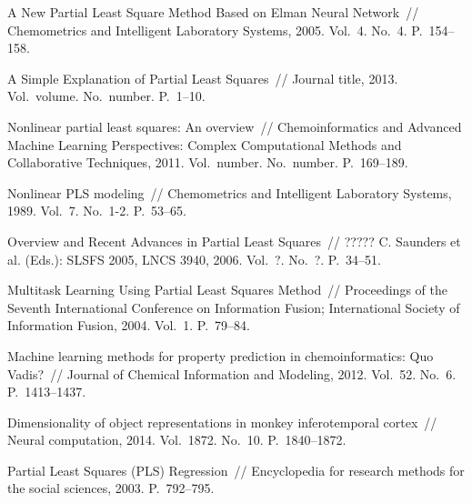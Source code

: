 \documentclass[12pt,twoside]{article}
\begin{document}
\begin{thebibliography}{10}
{A New Partial Least Square Method Based on Elman Neural Network}~//
Chemometrics and Intelligent Laboratory Systems, 2005.
Vol.~4.
No.~4.
P.~154--158.


{A Simple Explanation of Partial Least Squares}~//
Journal title, 2013.
Vol.~volume.
No.~number.
P.~1--10.


{Nonlinear partial least squares: An overview}~//
Chemoinformatics and Advanced Machine Learning Perspectives: Complex Computational Methods and Collaborative Techniques, 2011.
Vol.~number.
No.~number.
P.~169--189.


{Nonlinear PLS modeling}~//
Chemometrics and Intelligent Laboratory Systems, 1989.
Vol.~7.
No.~1-2.
P.~53--65.

{Overview and Recent Advances in Partial Least Squares}~//
????? C. Saunders et al. (Eds.): SLSFS 2005, LNCS 3940, 2006.
Vol.~?.
No.~?.
P.~34--51.

{Multitask Learning Using Partial Least Squares Method}~//
Proceedings of the Seventh International Conference on Information Fusion; International Society of Information Fusion, 2004.
Vol.~1.
P.~79--84.

{Machine learning methods for property prediction in chemoinformatics: Quo Vadis?}~//
Journal of Chemical Information and Modeling, 2012.
Vol.~52.
No.~6.
P.~1413--1437.

{Dimensionality of object representations in monkey inferotemporal cortex}~//
Neural computation, 2014.
Vol.~1872.
No.~10.
P.~1840--1872.

{Partial Least Squares (PLS) Regression}~//
Encyclopedia for research methods for the social sciences, 2003.
P.~792--795.


\end{thebibliography}
\end{document}

